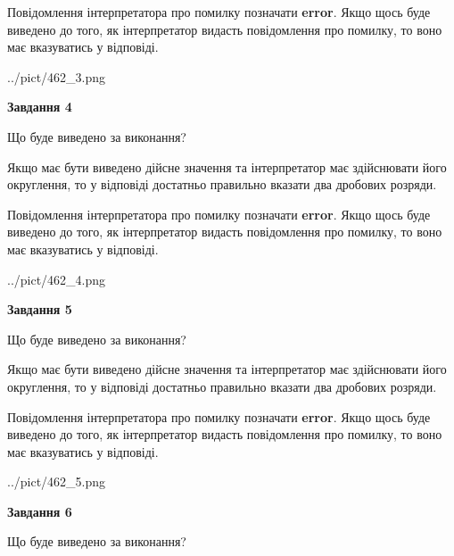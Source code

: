 \documentclass[12pt, ukrainian]{article}
\begin{document}
{\begin {Large}
Повідомлення інтерпретатора про помилку позначати \textbf{error}.
Якщо щось буде виведено до того, як інтерпретатор видасть повідомлення про помилку, 
то воно має вказуватись у відповіді. \par

\begin{center}
	{../pict/462_3.png}
\end{center}
\newpage

{\begin {center}\textbf{Завдання 4}\end {center}}\par
Що буде виведено за виконання? \par

Якщо має бути виведено дійсне значення та інтерпретатор має здійснювати його округлення, 
то у відповіді достатньо правильно вказати два дробових розряди.

Повідомлення інтерпретатора про помилку позначати \textbf{error}.
Якщо щось буде виведено до того, як інтерпретатор видасть повідомлення про помилку, 
то воно має вказуватись у відповіді. \par

\begin{center}
	{../pict/462_4.png}
\end{center}
\newpage

{\begin {center}\textbf{Завдання 5}\end {center}}\par
Що буде виведено за виконання? \par

Якщо має бути виведено дійсне значення та інтерпретатор має здійснювати його округлення, 
то у відповіді достатньо правильно вказати два дробових розряди.

Повідомлення інтерпретатора про помилку позначати \textbf{error}.
Якщо щось буде виведено до того, як інтерпретатор видасть повідомлення про помилку, 
то воно має вказуватись у відповіді. \par

\begin{center}
	{../pict/462_5.png}
\end{center}
\newpage

{\begin {center}\textbf{Завдання 6}\end {center}}\par
Що буде виведено за виконання? \par


\end{Large}}
\end{document}

